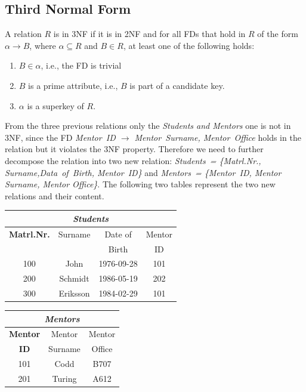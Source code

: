 \subsection{Third Normal Form}
A relation $R$ is in 3NF if it is in 2NF and for all FDs that hold in $R$
of the form $\alpha \rightarrow B$, where $\alpha \subseteq  R$ and $B \in R$, 
at least one of the following holds: 
\begin{enumerate}
  \item $B \in \alpha$, i.e., the FD is trivial
  \item $B$ is a prime attribute, i.e., $B$ is part of a candidate key.
  \item $\alpha$ is a superkey of $R$.
\end{enumerate}

From the three previous relations only the \textit{Students and Mentors} one is not in 3NF, since 
the FD \textit{Mentor~ID $\rightarrow$ Mentor~Surname, Mentor~Office} holds in the relation but 
it violates the 3NF property. Therefore we need to further decompose the relation into two
new relation: \textit{Students~= \{Matrl.Nr., Surname,Data~of~Birth, Mentor~ID\}} and
\textit{Mentors~= \{Mentor~ID, Mentor Surname, Mentor Office\}}. The following two tables represent
the two new relations and their content.

\begin{table}[ht]
\begin{minipage}[t]{0.5\linewidth}\centering
\begin{tabular}{|c|c|c|c|}
\hline
\multicolumn{4}{|c|}{\textit{Students}} \\
\hline
\textbf{Matrl.Nr.} & Surname & Date of  & Mentor \\
                   &         & Birth    & ID     \\
\hline \hline
100 & John     & 1976-09-28 & 101 \\
200 & Schmidt  & 1986-05-19 & 202 \\
300 & Eriksson & 1984-02-29 & 101 \\
\hline
\end{tabular}
\end{minipage}
\hspace{0.5cm}
\begin{minipage}[t]{0.5\linewidth}
\centering
\begin{tabular}{|c|c|c|}
\hline
\multicolumn{3}{|c|}{\textit{Mentors}} \\ \hline
 \textbf{Mentor} & Mentor  & Mentor \\
 \textbf{ID}     & Surname & Office \\
 \hline \hline
 101 & Codd   & B707 \\
 201 & Turing & A612 \\ \hline
\end{tabular}
\end{minipage}
\end{table}

